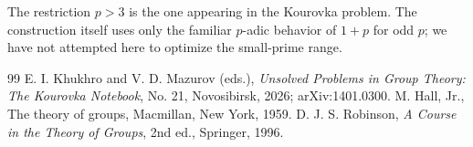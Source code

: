 \documentclass[11pt]{amsart}
\theoremstyle{definition}
\begin{document}
The restriction $p>3$ is the one appearing in the Kourovka problem.  The construction itself uses only the familiar $p$-adic behavior of $1+p$ for odd $p$; we have not attempted here to optimize the small-prime range.

\begin{thebibliography}{99}
 E. I. Khukhro and V. D. Mazurov (eds.), \emph{Unsolved Problems in Group Theory: The Kourovka Notebook}, No. 21, Novosibirsk, 2026; arXiv:1401.0300.
 M. Hall, Jr., The theory of groups, Macmillan, New York, 1959.
 D. J. S. Robinson, \emph{A Course in the Theory of Groups}, 2nd ed., Springer, 1996.
\end{thebibliography}
\end{document}
